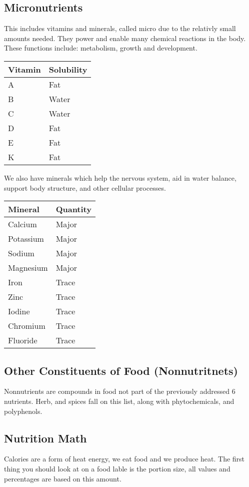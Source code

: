 \documentclass[letterpaper, 11pt]{article}
\begin{document}
\subsection{Micronutrients}
\label{sec:org2740a6f}
This includes vitamins and minerals, called micro due to the relativly small amounts needed. They power and enable many chemical reactions in the body. These functions include: metabolism, growth and development.\\
\begin{center}
\begin{tabular}{ll}
Vitamin & Solubility\\
\hline
A & Fat\\
B & Water\\
C & Water\\
D & Fat\\
E & Fat\\
K & Fat\\
\end{tabular}
\end{center}
We also have minerals which help the nervous system, aid in water balance, support body structure, and other cellular processes.\\
\begin{center}
\begin{tabular}{ll}
Mineral & Quantity\\
\hline
Calcium & Major\\
Potassium & Major\\
Sodium & Major\\
Magnesium & Major\\
Iron & Trace\\
Zinc & Trace\\
Iodine & Trace\\
Chromium & Trace\\
Fluoride & Trace\\
\end{tabular}
\end{center}
\subsection{Other Constituents of Food (Nonnutritnets)}
\label{sec:org7f6b59c}
Nonnutrients are compounds in food not part of the previously addressed 6 nutrients. Herb, and spices fall on this list, along with phytochemicals, and polyphenols.\\
\subsection{Nutrition Math}
\label{sec:org03ee0d4}
Calories are a form of heat energy, we eat food and we produce heat. The first thing you should look at on a food lable is the portion size, all values and percentages are based on this amount.\\
\end{document}
